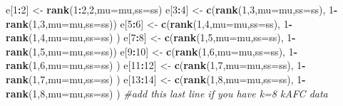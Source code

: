\documentclass[]{article}
\newenvironment{Shaded}{\begin{snugshade}}{\end{snugshade}}
\newcommand{\KeywordTok}[1]{\textcolor[rgb]{0.13,0.29,0.53}{\textbf{#1}}}
\newcommand{\DataTypeTok}[1]{\textcolor[rgb]{0.13,0.29,0.53}{#1}}
\newcommand{\DecValTok}[1]{\textcolor[rgb]{0.00,0.00,0.81}{#1}}
\newcommand{\StringTok}[1]{\textcolor[rgb]{0.31,0.60,0.02}{#1}}
\newcommand{\CommentTok}[1]{\textcolor[rgb]{0.56,0.35,0.01}{\textit{#1}}}
\newcommand{\OperatorTok}[1]{\textcolor[rgb]{0.81,0.36,0.00}{\textbf{#1}}}
\newcommand{\NormalTok}[1]{#1}
\begin{document}
\begin{Shaded}
\begin{Highlighting}[]
\NormalTok{    e[}\DecValTok{1}\OperatorTok{:}\DecValTok{2}\NormalTok{]  <-}\StringTok{ }\KeywordTok{rank}\NormalTok{(}\DecValTok{1}\OperatorTok{:}\DecValTok{2}\NormalTok{,}\DecValTok{2}\NormalTok{,}\DataTypeTok{mu=}\NormalTok{mu,}\DataTypeTok{ss=}\NormalTok{ss)    }
\NormalTok{    e[}\DecValTok{3}\OperatorTok{:}\DecValTok{4}\NormalTok{]  <-}\StringTok{ }\KeywordTok{c}\NormalTok{(}\KeywordTok{rank}\NormalTok{(}\DecValTok{1}\NormalTok{,}\DecValTok{3}\NormalTok{,}\DataTypeTok{mu=}\NormalTok{mu,}\DataTypeTok{ss=}\NormalTok{ss), }\DecValTok{1}\OperatorTok{-}\StringTok{ }\KeywordTok{rank}\NormalTok{(}\DecValTok{1}\NormalTok{,}\DecValTok{3}\NormalTok{,}\DataTypeTok{mu=}\NormalTok{mu,}\DataTypeTok{ss=}\NormalTok{ss))}
\NormalTok{    e[}\DecValTok{5}\OperatorTok{:}\DecValTok{6}\NormalTok{]  <-}\StringTok{ }\KeywordTok{c}\NormalTok{(}\KeywordTok{rank}\NormalTok{(}\DecValTok{1}\NormalTok{,}\DecValTok{4}\NormalTok{,}\DataTypeTok{mu=}\NormalTok{mu,}\DataTypeTok{ss=}\NormalTok{ss), }\DecValTok{1}\OperatorTok{-}\StringTok{ }\KeywordTok{rank}\NormalTok{(}\DecValTok{1}\NormalTok{,}\DecValTok{4}\NormalTok{,}\DataTypeTok{mu=}\NormalTok{mu,}\DataTypeTok{ss=}\NormalTok{ss) )}
\NormalTok{    e[}\DecValTok{7}\OperatorTok{:}\DecValTok{8}\NormalTok{]  <-}\StringTok{ }\KeywordTok{c}\NormalTok{(}\KeywordTok{rank}\NormalTok{(}\DecValTok{1}\NormalTok{,}\DecValTok{5}\NormalTok{,}\DataTypeTok{mu=}\NormalTok{mu,}\DataTypeTok{ss=}\NormalTok{ss), }\DecValTok{1}\OperatorTok{-}\StringTok{ }\KeywordTok{rank}\NormalTok{(}\DecValTok{1}\NormalTok{,}\DecValTok{5}\NormalTok{,}\DataTypeTok{mu=}\NormalTok{mu,}\DataTypeTok{ss=}\NormalTok{ss))}
\NormalTok{    e[}\DecValTok{9}\OperatorTok{:}\DecValTok{10}\NormalTok{] <-}\StringTok{ }\KeywordTok{c}\NormalTok{(}\KeywordTok{rank}\NormalTok{(}\DecValTok{1}\NormalTok{,}\DecValTok{6}\NormalTok{,}\DataTypeTok{mu=}\NormalTok{mu,}\DataTypeTok{ss=}\NormalTok{ss), }\DecValTok{1}\OperatorTok{-}\StringTok{ }\KeywordTok{rank}\NormalTok{(}\DecValTok{1}\NormalTok{,}\DecValTok{6}\NormalTok{,}\DataTypeTok{mu=}\NormalTok{mu,}\DataTypeTok{ss=}\NormalTok{ss) )}
\NormalTok{    e[}\DecValTok{11}\OperatorTok{:}\DecValTok{12}\NormalTok{] <-}\StringTok{ }\KeywordTok{c}\NormalTok{(}\KeywordTok{rank}\NormalTok{(}\DecValTok{1}\NormalTok{,}\DecValTok{7}\NormalTok{,}\DataTypeTok{mu=}\NormalTok{mu,}\DataTypeTok{ss=}\NormalTok{ss), }\DecValTok{1}\OperatorTok{-}\StringTok{ }\KeywordTok{rank}\NormalTok{(}\DecValTok{1}\NormalTok{,}\DecValTok{7}\NormalTok{,}\DataTypeTok{mu=}\NormalTok{mu,}\DataTypeTok{ss=}\NormalTok{ss) )}
\NormalTok{    e[}\DecValTok{13}\OperatorTok{:}\DecValTok{14}\NormalTok{] <-}\StringTok{ }\KeywordTok{c}\NormalTok{(}\KeywordTok{rank}\NormalTok{(}\DecValTok{1}\NormalTok{,}\DecValTok{8}\NormalTok{,}\DataTypeTok{mu=}\NormalTok{mu,}\DataTypeTok{ss=}\NormalTok{ss), }\DecValTok{1}\OperatorTok{-}\StringTok{ }\KeywordTok{rank}\NormalTok{(}\DecValTok{1}\NormalTok{,}\DecValTok{8}\NormalTok{,}\DataTypeTok{mu=}\NormalTok{mu,}\DataTypeTok{ss=}\NormalTok{ss) ) }
    \CommentTok{#add this last line if you have k=8 kAFC data}


\end{Highlighting}
\end{Shaded}
\end{document}
